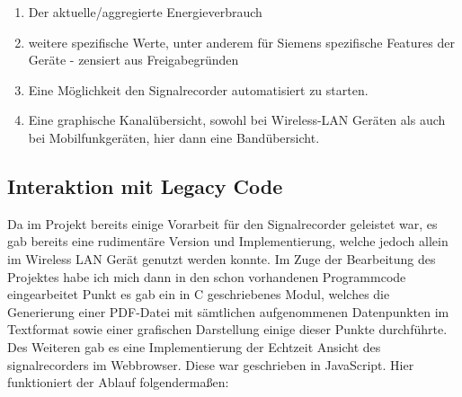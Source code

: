 \begin{enumerate}
\begin{enumerate}
                        \item Der aktuelle/aggregierte Energieverbrauch
                        \item weitere spezifische Werte, unter anderem für Siemens spezifische Features der Geräte - zensiert aus Freigabegründen
                        \item Eine Möglichkeit den Signalrecorder automatisiert zu starten.
                        \item Eine graphische Kanalübersicht, sowohl bei Wireless-LAN Geräten als auch bei Mobilfunkgeräten, hier dann eine Bandübersicht.
                \end{enumerate}
\end{enumerate}
\subsection{Interaktion mit Legacy Code}
Da im Projekt bereits einige Vorarbeit für den Signalrecorder geleistet war, es gab bereits eine rudimentäre Version und Implementierung, welche jedoch allein im Wireless LAN Gerät genutzt werden konnte.  Im Zuge der Bearbeitung des Projektes  habe ich mich dann in den schon vorhandenen Programmcode eingearbeitet Punkt es gab ein in C geschriebenes Modul,  welches die Generierung einer PDF-Datei mit sämtlichen aufgenommenen Datenpunkten im Textformat sowie einer grafischen Darstellung einige dieser Punkte durchführte. \\
 Des Weiteren gab es eine Implementierung der Echtzeit Ansicht des signalrecorders im Webbrowser. Diese war geschrieben in JavaScript.  Hier funktioniert der Ablauf  folgendermaßen:
